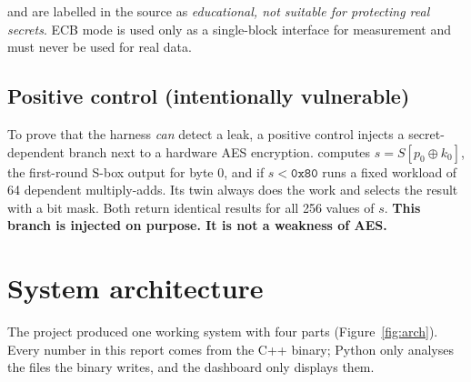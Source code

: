  and  are labelled in the source as \emph{educational, not suitable for protecting real secrets}. ECB mode is used only as a single-block interface for measurement and must never be used for real data.

\subsection{Positive control (intentionally vulnerable)}

To prove that the harness \emph{can} detect a leak, a positive control injects a secret-dependent branch next to a hardware AES encryption.  computes $s = S[p_0 \oplus k_0]$, the first-round S-box output for byte 0, and if $s < \texttt{0x80}$ runs a fixed workload of 64 dependent multiply-adds. Its twin  always does the work and selects the result with a bit mask. Both return identical results for all 256 values of $s$. \textbf{This branch is injected on purpose. It is not a weakness of AES.}

\section{System architecture}
\label{sec:arch}

The project produced one working system with four parts (Figure~\ref{fig:arch}). Every number in this report comes from the C++ binary; Python only analyses the files the binary writes, and the dashboard only displays them.

